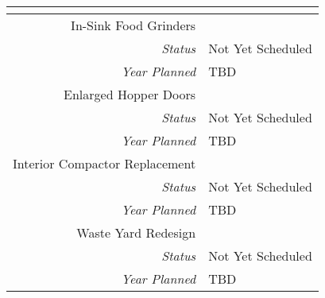 
    \begin{tabularx}{\textwidth}{r|X|}
    \cline{2-1}
    \multicolumn{1}{l|}{}                                                        & \cellcolor{ccorange}{\color[HTML]{FFFFFF}Fulton} \\ \hline
\multicolumn{1}{|V{.2\columnwidth}|}{\cellcolor{ccorangelight}In-Sink Food Grinders}          &                                                                  \\
    \multicolumn{1}{|r|}{\cellcolor{ccorangelight}\textit{Status}}                & Not Yet Scheduled                                                         \\
    \multicolumn{1}{|r|}{\cellcolor{ccorangelight}\textit{Year Planned}}                  & TBD                                                     \\ \hline
\multicolumn{1}{|V{.2\columnwidth}|}{\cellcolor{ccorangelight}Enlarged Hopper Doors}          &                                                                  \\
    \multicolumn{1}{|r|}{\cellcolor{ccorangelight}\textit{Status}}                & Not Yet Scheduled                                                         \\
    \multicolumn{1}{|r|}{\cellcolor{ccorangelight}\textit{Year Planned}}                  & TBD                                                     \\ \hline
\multicolumn{1}{|V{.2\columnwidth}|}{\cellcolor{ccorangelight}Interior Compactor Replacement}          &                                                                  \\
    \multicolumn{1}{|r|}{\cellcolor{ccorangelight}\textit{Status}}                & Not Yet Scheduled                                                         \\
    \multicolumn{1}{|r|}{\cellcolor{ccorangelight}\textit{Year Planned}}                  & TBD                                                     \\ \hline
\multicolumn{1}{|V{.2\columnwidth}|}{\cellcolor{ccorangelight}Waste Yard Redesign}          &                                                                  \\
    \multicolumn{1}{|r|}{\cellcolor{ccorangelight}\textit{Status}}                & Not Yet Scheduled                                                         \\
    \multicolumn{1}{|r|}{\cellcolor{ccorangelight}\textit{Year Planned}}                  & TBD                                                     \\ \hline
\end{tabularx}